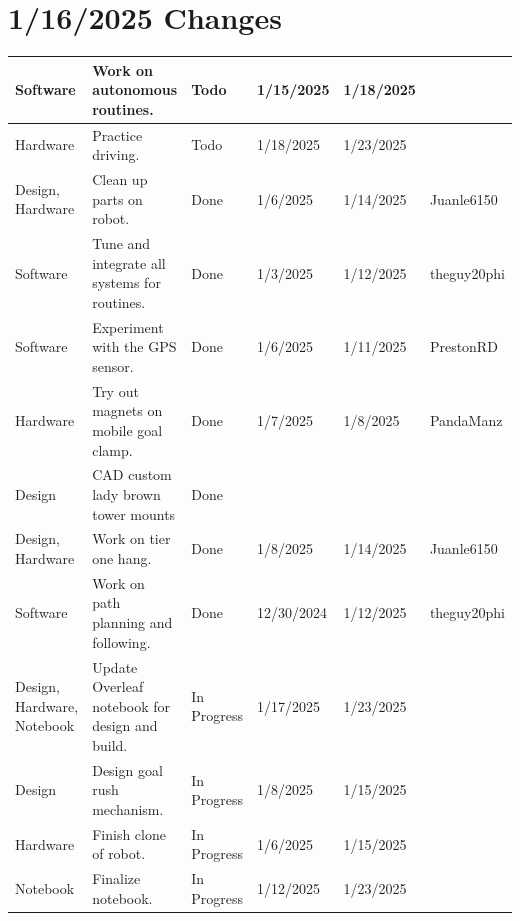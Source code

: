 \section{1/16/2025 Changes}
\begin{center}
\begin{longtable}{| p{40pt} | p{150pt} | p{35pt} | p{33pt} | p{33pt} | p{40pt} |}
\hline \rowcolor{IndianRed1}
Software & Work on autonomous routines. & Todo & 1/15/2025 & 1/18/2025 & \\
\hline \rowcolor{IndianRed1}
Hardware & Practice driving. & Todo & 1/18/2025 & 1/23/2025 & \\
\hline \rowcolor{DarkSeaGreen1}
Design, Hardware & Clean up parts on robot. & Done & 1/6/2025 & 1/14/2025 & Juanle6150 \\
\hline \rowcolor{DarkSeaGreen1}
Software & Tune and integrate all systems for routines. & Done & 1/3/2025 & 1/12/2025 & theguy20phi \\
\hline \rowcolor{DarkSeaGreen1}
Software & Experiment with the GPS sensor. & Done & 1/6/2025 & 1/11/2025 & PrestonRD \\
\hline \rowcolor{DarkSeaGreen1}
Hardware & Try out magnets on mobile goal clamp. & Done & 1/7/2025 & 1/8/2025 & PandaManz \\
\hline \rowcolor{DarkSeaGreen1}
Design & CAD custom lady brown tower mounts & Done &  &  & \\
\hline \rowcolor{DarkSeaGreen1}
Design, Hardware & Work on tier one hang. & Done & 1/8/2025 & 1/14/2025 & Juanle6150 \\
\hline \rowcolor{DarkSeaGreen1}
Software & Work on path planning and following. & Done & 12/30/2024 & 1/12/2025 & theguy20phi \\
\hline \rowcolor{LightGoldenrod1}
Design, Hardware, Notebook & Update Overleaf notebook for design and build. & In Progress & 1/17/2025 & 1/23/2025 & \\
\hline \rowcolor{LightGoldenrod1}
Design & Design goal rush mechanism. & In Progress & 1/8/2025 & 1/15/2025 & \\
\hline \rowcolor{LightGoldenrod1}
Hardware & Finish clone of robot. & In Progress & 1/6/2025 & 1/15/2025 & \\
\hline \rowcolor{LightGoldenrod1}
Notebook & Finalize notebook. & In Progress & 1/12/2025 & 1/23/2025 & \\
\hline
\end{longtable}
\end{center}


